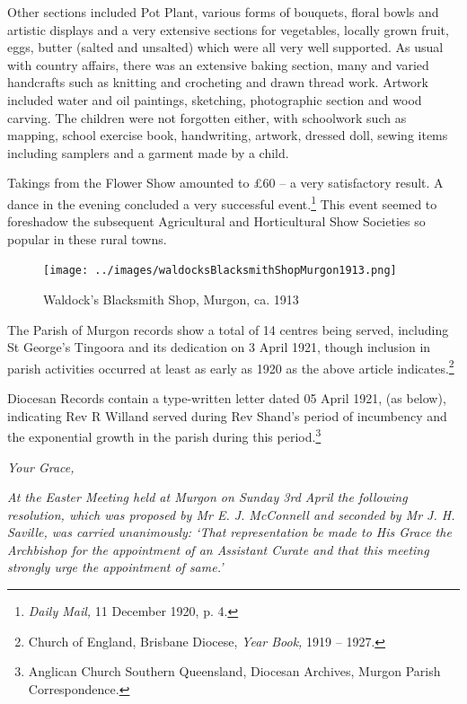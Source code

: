 Other sections included Pot Plant, various forms of bouquets, floral bowls and artistic displays and a very extensive sections for vegetables, locally grown fruit, eggs, butter (salted and unsalted) which were all very well supported. As usual with country affairs, there was an extensive baking section, many and varied handcrafts such as knitting and crocheting and drawn thread work. Artwork included water and oil paintings, sketching, photographic section and wood carving. The children were not forgotten either, with schoolwork such as mapping, school exercise book, handwriting, artwork, dressed doll, sewing items including samplers and a garment made by a child.



Takings from the Flower Show amounted to \pounds60 -- a very satisfactory result. A dance in the evening concluded a very successful event.\footnote{\emph{Daily Mail,} 11 December 1920, p. 4.} This event seemed to foreshadow the subsequent Agricultural and Horticultural Show Societies so popular in these rural towns.








\begin{figure}
\begin{center}
\texttt{[image: ../images/waldocksBlacksmithShopMurgon1913.png]}
\caption{Waldock's Blacksmith Shop, Murgon, ca. 1913}
\end{center}
\end{figure}




The Parish of Murgon records show a total of 14 centres being served, including St George's Tingoora and its dedication on 3 April 1921, though inclusion in parish activities occurred at least as early as 1920 as the above article indicates.\footnote{Church of England, Brisbane Diocese, \emph{Year Book,} 1919 -- 1927.}


Diocesan Records contain a type-written letter dated 05 April 1921, (as below), indicating Rev R Willand served during Rev Shand's period of incumbency and the exponential growth in the parish during this period.\footnote{Anglican Church Southern Queensland, Diocesan Archives, Murgon Parish Correspondence.}


\medskip


\emph{Your Grace,}



\emph{At the Easter Meeting held at Murgon on Sunday 3rd April the following resolution, which was proposed by Mr E. J. McConnell and seconded by Mr J. H. Saville, was carried unanimously: `That representation be made to His Grace the Archbishop for the appointment of an Assistant Curate and that this meeting strongly urge the appointment of same.'}



